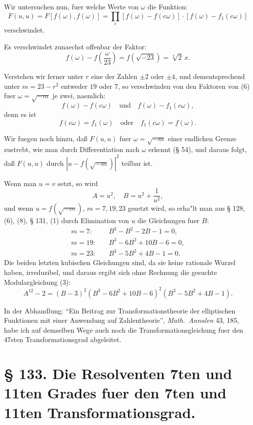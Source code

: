 \documentclass[12pt,a4paper]{article}
\theoremstyle{plain}
\theoremstyle{definition}
\theoremstyle{remark}
\begin{document}
Wir untersuchen nun, fuer welche Werte von $\omega$ die Funktion:
\begin{equation}\label{eq:132_6}
F(u, u) = F[f(\omega), f(\omega)] = \prod_{c} [f(\omega) - f(c\omega)] \cdot [f(\omega) - f_1(c\omega)]
\end{equation}
verschwindet.

Es verschwindet zunaechst offenbar der Faktor:
\[
f(\omega) - f\left(\frac{\omega}{23}\right) = f(\sqrt{-23}) = \sqrt[4]{2}\, x.
\]

Verstehen wir ferner unter $r$ eine der Zahlen $\pm 2$ oder $\pm 4$, und dementsprechend unter $m = 23 - r^2$ entweder $19$ oder $7$, so verschwinden von den Faktoren von (6) fuer $\omega = \sqrt{-m}$ je zwei, naemlich:
\[
f(\omega) - f(c\omega) \quad \text{und} \quad f(\omega) - f_1(c\omega),
\]
denn es ist
\[
f(c\omega) = f_1(\omega) \quad \text{oder} \quad f_1(c\omega) = f(\omega).
\]

Wir fuegen noch hinzu, da\ss{} $F(u, u)$ fuer $\omega = \sqrt{-m}$ einer endlichen Grenze zustrebt, wie man durch Differentiation nach $\omega$ erkennt (\S{} 54), und daraus folgt, da\ss{} $F(u, u)$ durch $|u - f(\sqrt{-m})|^2$ teilbar ist.

Wenn man $u = v$ setzt, so wird
\[
A = u^2, \quad B = u^2 + \frac{1}{u^2},
\]
und wenn $u = f(\sqrt{-m})$, $m = 7, 19, 23$ gesetzt wird, so erha"lt man aus \S{} 128, (6), (8), \S{} 131, (1) durch Elimination von $u$ die Gleichungen fuer $B$:
\begin{align*}
m = 7: & \quad B^3 - B^2 - 2B - 1 = 0, \\
m = 19: & \quad B^3 - 6B^2 + 10B - 6 = 0, \\
m = 23: & \quad B^3 - 5B^2 + 4B - 1 = 0.
\end{align*}
Die beiden letzten kubischen Gleichungen sind, da sie keine rationale Wurzel haben, irreduzibel, und daraus ergibt sich ohne Rechnung die gesuchte Modulargleichung (3):
\begin{equation}\label{eq:132_7}
A^{12} - 2 = (B - 3)^2 (B^3 - 6B^2 + 10B - 6)^2 (B^3 - 5B^2 + 4B - 1).
\end{equation}

In der Abhandlung: ``Ein Beitrag zur Transformationstheorie der elliptischen Funktionen mit einer Anwendung auf Zahlentheorie'', \textit{Math.\ Annalen} 43, 185, habe ich auf demselben Wege auch noch die Transformationsgleichung fuer den 47sten Transformationsgrad abgeleitet.

\newpage

\section*{\S{} 133. Die Resolventen 7ten und 11ten Grades fuer den 7ten und 11ten Transformationsgrad.}
\end{document}
